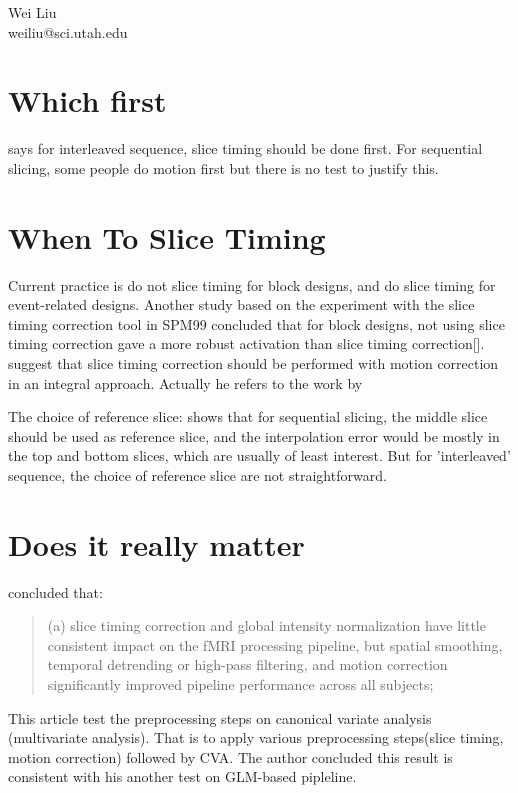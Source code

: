 \documentclass[fleqn]{article}
\begin{document}

Wei Liu\\
weiliu@sci.utah.edu

\section{Which first}
\citet{Brett08} says for interleaved sequence, slice timing should be done first. For sequential slicing, some people do motion first but there is no test to justify this.
\section{When To Slice Timing}
Current practice is do not slice timing for block designs, and do slice timing for event-related designs. Another study based on the experiment with the slice timing correction tool in SPM99 concluded that for block designs, not using slice timing correction gave a more robust activation than slice timing correction[]. \citet{smith2004S208} suggest that slice timing correction should be performed with motion correction in an integral approach. Actually he refers to the work by \citet{Bannister03}

The choice of reference slice: \citet{Egolf} shows that for sequential slicing, the middle slice should be used as reference slice, and the interpolation error would be mostly in the top and bottom slices, which are usually of least interest. But for 'interleaved' sequence, the choice of reference slice are not straightforward.
\section{Does it really matter}
\citet{Zhang2009264} concluded that: 
\begin{quote}
 (a) slice timing correction and global intensity normalization have little consistent impact on the fMRI processing pipeline, but spatial smoothing, temporal detrending or high-pass filtering, and motion correction significantly improved pipeline performance across all subjects;
\end{quote}
 This article test the preprocessing steps on canonical variate analysis (multivariate analysis). That is to apply various preprocessing steps(slice timing, motion correction) followed by CVA. The author concluded this result is consistent with his another test\citep{Zhang20081242} on GLM-based pipleline. 
\end{document}
